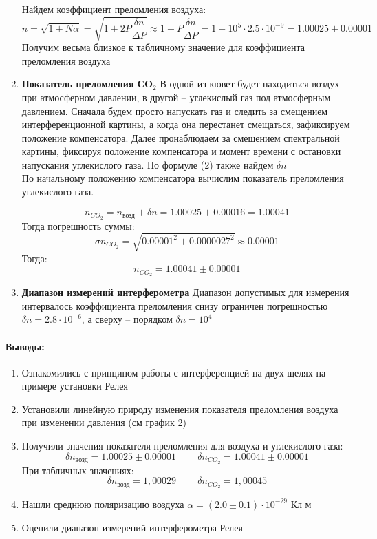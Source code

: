 \documentclass[a4paper,12pt]{article}
\begin{document}
\begin{enumerate}
 Найдем коэффициент преломления воздуха: 
 \[ n = \sqrt{1 + N\alpha}= \sqrt{1 + 2P\frac{\delta n }{\Delta P}}\approx 1 + P\frac{\delta n }{\Delta P} = 1 + 10^5\cdot 2.5\cdot 10^{-9} =1.00025 \pm 0.00001\]
 Получим весьма близкое к табличному значение для коэффициента преломления воздуха
 \item \textbf{Показатель преломления СO$_2$}
 В одной из кювет будет находиться воздух при атмосферном давлении, в другой -- углекислый газ под атмосферным давлением. Сначала будем просто напускать газ и следить за смещением интерференционной картины, а когда она перестанет смещаться, зафиксируем положение компенсатора. Далее пронаблюдаем за смещением спектральной картины, фиксируя положение компенсатора и момент времени с остановки напускания углекислого газа. По формуле (2) также найдем $\delta n$\\
 По начальному положению компенсатора вычислим показатель преломления углекислого газа.

$$n_{CO_2} = n_{\text{возд} }+\delta n = 1.00025 + 0.00016 = 1.00041$$
Тогда погрешность суммы:
$$ \sigma n_{CO_2} = \sqrt{0.00001^2 + 0.0000027^2}\approx 0.00001$$
Тогда:
$$n_{CO_2} = 1.00041 \pm 0.00001$$ 
\item \textbf{Диапазон измерений интерферометра}
Диапазон допустимых для измерения интервалось коэффициента преломления снизу ограничен погрешностью $\delta n = 2.8 \cdot 10^{-6}$, а сверху -- порядком $
\delta n = 10^4$
\end{enumerate}
\paragraph{Выводы:}
\begin{enumerate}
\item Ознакомились с принципом работы с интерференцией на двух щелях на примере установки Релея
\item Установили линейную природу изменения показателя преломления воздуха при изменении давления (см график 2)
\item Получили значения показателя преломления для воздуха и углекислого газа: 
\begin{equation*}
\delta n_{\text{возд}} = 1.00025 \pm 0.00001\;\;\;\;\;\;\;\; \delta n_{CO_2} = 1.00041 \pm 0.00001
\end{equation*}
При табличных значениях: 
\begin{equation*}
\delta n_{\text{возд}} = 1,00029\;\;\;\;\;\;\;\;\delta n_{CO_2} = 1,00045
\end{equation*}
\item Нашли среднюю поляризацию воздуха $\alpha = (2.0 \pm 0.1)\cdot 10^{-29}$ Кл м 
\item Оценили диапазон измерений интерферометра Релея
\end{enumerate}
\end{document}
